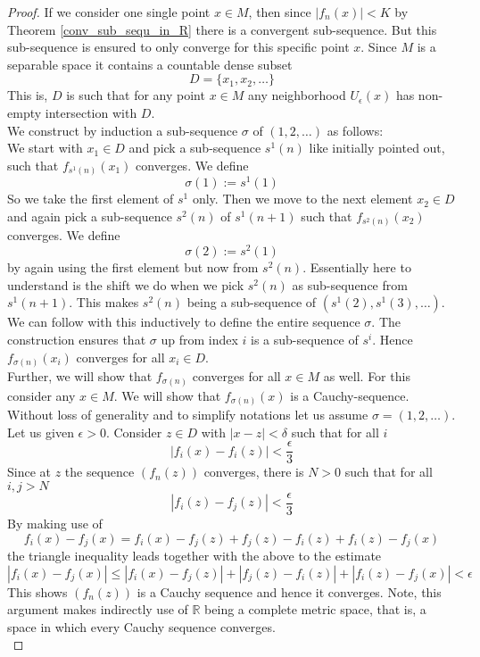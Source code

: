 \documentclass[17pt]{extarticle}
\begin{document}
\begin{proof}
	If we consider one single point $x\in M$, then since $|f_n(x)|<K$ by Theorem \ref{conv_sub_sequ_in_R}
	there is a convergent sub-sequence. But this sub-sequence is ensured to only converge for this specific point $x$. Since $M$ is a separable space it contains a countable dense subset 
	$$D=\{x_1, x_2, \dots\}$$
	This is, $D$ is such that for any point $x\in M$ any neighborhood $U_{\epsilon}(x)$ has non-empty intersection with $D$.\\
	We construct by induction a sub-sequence $\sigma$ of $(1, 2, \dots)$  as follows:\\
    We start with $x_1\in D$ and pick a sub-sequence $s^1(n)$ like initially pointed out, such that $f_{s^1(n)}(x_1)$ converges. We define 
    $$\sigma(1):=s^1(1)$$
    So we take the first element of $s^1$ only. Then we move to the next element $x_2\in D$ and again pick a sub-sequence $s^2(n)$ of $s^1(n+1)$ such that $f_{s^2(n)}(x_2)$ converges. We define
    $$\sigma(2):=s^2(1)$$
    by again using the first element but now from $s^2(n)$.
    Essentially here to understand is the shift we do when we pick $s^2(n)$ as sub-sequence from $s^1(n+1)$. This makes $s^2(n)$ being a sub-sequence of $(s^1(2), s^1(3), \dots)$.\\
    We can follow with this inductively to define the entire sequence $\sigma$. The construction ensures
    that $\sigma$ up from index $i$ is a sub-sequence of $s^i$. Hence $f_{\sigma(n)}(x_i)$ converges for all $x_i\in D$.\\
    Further, we will show that $f_{\sigma(n)}$ converges for all $x\in M$ as well.
    For this consider any $x\in M$. We will show that $f_{\sigma(n)}(x)$ is a Cauchy-sequence.
    Without loss of generality and to simplify notations let us assume $\sigma=(1, 2, \dots)$.
    Let us given $\epsilon>0$. Consider $z\in D$ with $|x-z|<\delta$ such that for all $i$
    $$|f_i(x)-f_i(z)|<\frac{\epsilon}{3}$$
    Since at $z$ the sequence $(f_n(z))$ converges, there is $N>0$ such that for all $i,j>N$
    $$|f_i(z)-f_j(z)|<\frac{\epsilon}{3}$$
    By making use of 
    $$f_i(x)-f_j(x)=f_i(x)-f_j(z)+f_j(z)-f_i(z)+f_i(z)-f_j(x)$$
    the triangle inequality leads together with the above to the estimate
    $$|f_i(x)-f_j(x)|\leq |f_i(x)-f_j(z)|+|f_j(z)-f_i(z)|+|f_i(z)-f_j(x)|<\epsilon$$
    This shows $(f_n(z))$ is a Cauchy sequence and hence it converges.
    Note, this argument makes indirectly use of $\mathbb{R}$ being a complete metric space, that is, a space in which every Cauchy sequence converges.\\

\end{proof}
\end{document}
